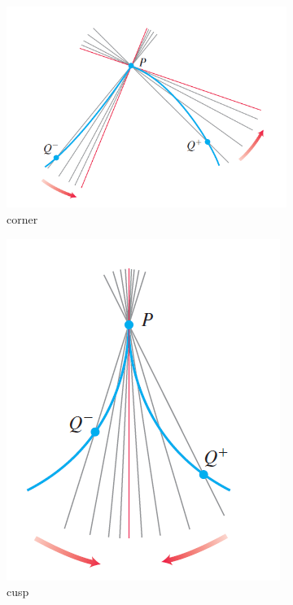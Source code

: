 \documentclass[12pt]{article}
\begin{document}
\begin{figure}[h!]
    \centering
    \begin{subfigure}{0.4\linewidth}
        \includegraphics[width = 0.8\linewidth]{Images/corner.png}
        \caption{corner}
    \end{subfigure}
    \begin{subfigure}{0.3\linewidth}
        \includegraphics[width = 0.8\linewidth]{Images/cusp.png}
        \caption{cusp}
    \end{subfigure}
    \begin{subfigure}{0.3\linewidth}

\end{subfigure}
\end{figure}
\end{document}
